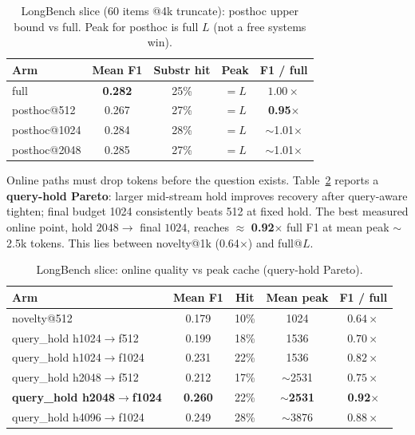 \documentclass[11pt,a4paper]{article}
\begin{document}
\begin{table}[!htbp]
\centering
\caption{LongBench slice (60 items @4k truncate): posthoc upper bound vs full.
Peak for posthoc is full $L$ (not a free systems win).}
\label{tab:lb-posthoc}
\small
\begin{tabular}{@{}lcccc@{}}
\toprule
Arm & Mean F1 & Substr hit & Peak & F1 / full \\
\midrule
full & \textbf{0.282} & 25\% & $=L$ & $1.00\times$ \\
posthoc@512 & 0.267 & 27\% & $=L$ & \textbf{0.95$\times$} \\
posthoc@1024 & 0.284 & 28\% & $=L$ & $\sim$1.01$\times$ \\
posthoc@2048 & 0.285 & 27\% & $=L$ & $\sim$1.01$\times$ \\
\bottomrule
\end{tabular}
\end{table}

Online paths must drop tokens before the question exists. Table~\ref{tab:lb-pareto} reports a \textbf{query-hold Pareto}: larger mid-stream hold improves recovery after query-aware tighten; final budget 1024 consistently beats 512 at fixed hold. The best measured online point, hold $2048\to$ final $1024$, reaches $\approx$ \textbf{0.92$\times$} full F1 at mean peak $\sim$2.5k tokens. This lies between novelty@1k (0.64$\times$) and full@$L$.

\begin{table}[!htbp]
\centering
\caption{LongBench slice: online quality vs peak cache (query-hold Pareto).}
\label{tab:lb-pareto}
\small
\begin{tabular}{@{}lcccc@{}}
\toprule
Arm & Mean F1 & Hit & Mean peak & F1 / full \\
\midrule
novelty@512 & 0.179 & 10\% & 1024 & $0.64\times$ \\
query\_hold h1024$\to$f512 & 0.199 & 18\% & 1536 & $0.70\times$ \\
query\_hold h1024$\to$f1024 & 0.231 & 22\% & 1536 & $0.82\times$ \\
query\_hold h2048$\to$f512 & 0.212 & 17\% & $\sim$2531 & $0.75\times$ \\
\textbf{query\_hold h2048$\to$f1024} & \textbf{0.260} & 22\% & $\sim$\textbf{2531} & \textbf{0.92$\times$} \\
query\_hold h4096$\to$f1024 & 0.249 & 28\% & $\sim$3876 & $0.88\times$ \\
\bottomrule
\end{tabular}
\end{table}
\end{document}
